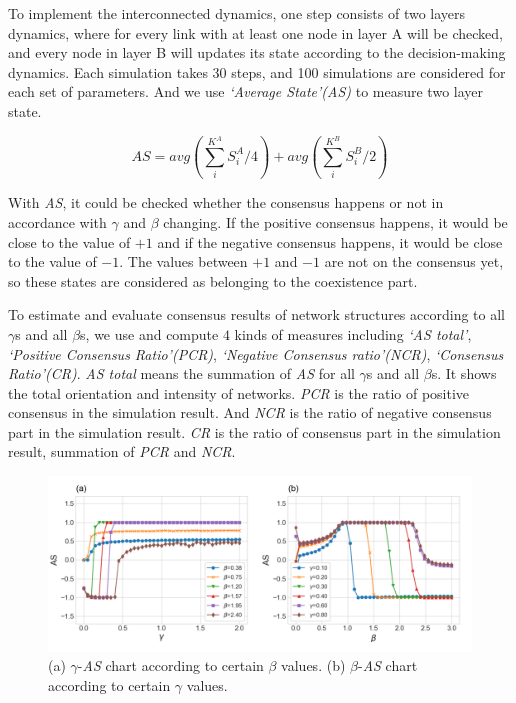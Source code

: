 \documentclass[english]{cccconf}
\begin{document}
To implement the interconnected dynamics, one step consists of two layers dynamics, where for every link with at least one node in layer A will be checked, and every node in layer B will updates its state according to the decision-making dynamics. Each simulation takes 30 steps, and 100 simulations are considered  for each set of parameters. And we use \textit{`Average State'(AS)} to measure two layer state.

\begin{equation}
AS = avg\left( {\sum\limits_i^{{K^A}} {S_i^A/4} } \right) + avg\left( {\sum\limits_i^{{K^B}} {S_i^B/2} } \right)
\end{equation}

With \textit{AS}, it could be checked whether the consensus happens or not in accordance with $\gamma$ and $\beta$ changing.  If the positive consensus happens, it would be close to the value of $+1$ and if the negative consensus happens, it would be close to the value of $-1$. The values between $+1$ and $-1$ are not on the consensus yet, so these states are considered as belonging to the coexistence part.

To estimate and evaluate consensus results of network structures according to all $\gamma$s and all $\beta$s, we use and compute $4$ kinds of measures including \textit{`AS total'}, \textit{`Positive Consensus Ratio'(PCR)}, \textit{`Negative Consensus ratio'(NCR)}, \textit{`Consensus Ratio'(CR)}. \textit{AS total} means the summation of \textit{AS} for all $\gamma$s and all $\beta$s. It shows the total orientation and intensity of networks. \textit{PCR} is the ratio of positive consensus in the simulation result. And \textit{NCR} is the ratio of negative consensus part in the simulation result. \textit{CR} is the ratio of consensus part in the simulation result, summation of \textit{PCR} and \textit{NCR}.
\begin{figure}[!htb]
	\centering
	\includegraphics[width=\hsize]{FIG2.png}
	\caption{(a) $\gamma$-\textit{AS} chart according to certain $\beta$ values. (b) $\beta$-\textit{AS} chart according to certain $\gamma$ values.}
	\label{Fig2}
\end{figure}
\end{document}
